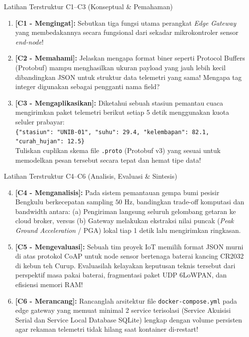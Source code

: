 \documentclass[aspectratio=169,10pt]{beamer}
\begin{document}
\begin{frame}{Latihan Terstruktur C1--C3 (Konseptual \& Pemahaman)}
    \begin{enumerate}
        \item \textbf{[C1 - Mengingat]:} Sebutkan tiga fungsi utama perangkat \textit{Edge Gateway} yang membedakannya secara fungsional dari sekadar mikrokontroler sensor \textit{end-node}!
        \item \textbf{[C2 - Memahami]:} Jelaskan mengapa format biner seperti Protocol Buffers (Protobuf) mampu menghasilkan ukuran payload yang jauh lebih kecil dibandingkan JSON untuk struktur data telemetri yang sama! Mengapa tag integer digunakan sebagai pengganti nama field?
        \item \textbf{[C3 - Mengaplikasikan]:} Diketahui sebuah stasiun pemantau cuaca mengirimkan paket telemetri berikut setiap 5 detik menggunakan kuota seluler prabayar:\\
        \texttt{\{"stasiun": "UNIB-01", "suhu": 29.4, "kelembapan": 82.1, "curah\_hujan": 12.5\}}\\
        Tuliskan cuplikan skema file \texttt{.proto} (Protobuf v3) yang sesuai untuk memodelkan pesan tersebut secara tepat dan hemat tipe data!
    \end{enumerate}
\end{frame}

\begin{frame}{Latihan Terstruktur C4--C6 (Analisis, Evaluasi \& Sintesis)}
    \begin{enumerate}\setcounter{enumi}{3}
        \item \textbf{[C4 - Menganalisis]:} Pada sistem pemantauan gempa bumi pesisir Bengkulu berkecepatan sampling $50\text{ Hz}$, bandingkan trade-off komputasi dan bandwidth antara: (a) Pengiriman langsung seluruh gelombang getaran ke cloud broker, versus (b) Gateway melakukan ekstraksi nilai puncak (\textit{Peak Ground Acceleration} / PGA) lokal tiap 1 detik lalu mengirimkan ringkasan.
        \item \textbf{[C5 - Mengevaluasi]:} Sebuah tim proyek IoT memilih format JSON murni di atas protokol CoAP untuk node sensor bertenaga baterai kancing CR2032 di kebun teh Curup. Evaluasilah kelayakan keputusan teknis tersebut dari perspektif masa pakai baterai, fragmentasi paket UDP 6LoWPAN, dan efisiensi memori RAM!
        \item \textbf{[C6 - Merancang]:} Rancanglah arsitektur file \texttt{docker-compose.yml} pada edge gateway yang memuat minimal 2 service terisolasi (Service Akuisisi Serial dan Service Local Database SQLite) lengkap dengan volume persisten agar rekaman telemetri tidak hilang saat kontainer di-restart!
    \end{enumerate}
\end{frame}
\end{document}
